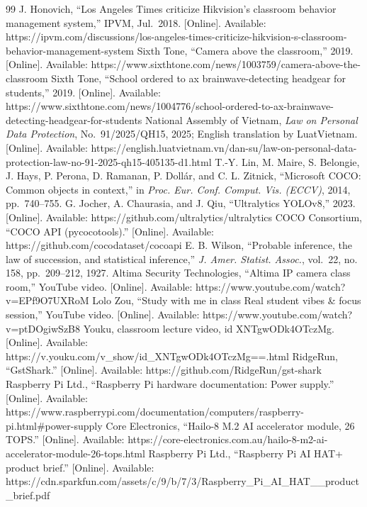 \begin{thebibliography}{99}
 J. Honovich, ``Los Angeles Times criticize Hikvision's classroom behavior management system,'' IPVM, Jul.~2018. {[}Online{]}. Available: https://ipvm.com/discussions/los-angeles-times-criticize-hikvision-s-classroom-behavior-management-system
 Sixth Tone, ``Camera above the classroom,'' 2019. {[}Online{]}. Available: https://www.sixthtone.com/news/1003759/camera-above-the-classroom
 Sixth Tone, ``School ordered to ax brainwave-detecting headgear for students,'' 2019. {[}Online{]}. Available: https://www.sixthtone.com/news/1004776/school-ordered-to-ax-brainwave-detecting-headgear-for-students
 National Assembly of Vietnam, \emph{Law on Personal Data Protection}, No.~91/2025/QH15, 2025; English translation by LuatVietnam. {[}Online{]}. Available: https://english.luatvietnam.vn/dan-su/law-on-personal-data-protection-law-no-91-2025-qh15-405135-d1.html
 T.-Y. Lin, M. Maire, S. Belongie, J. Hays, P. Perona, D. Ramanan, P. Dollár, and C. L. Zitnick, ``Microsoft COCO: Common objects in context,'' in \emph{Proc. Eur. Conf. Comput. Vis. (ECCV)}, 2014, pp.~740--755.
 G. Jocher, A. Chaurasia, and J. Qiu, ``Ultralytics YOLOv8,'' 2023. {[}Online{]}. Available: https://github.com/ultralytics/ultralytics
 COCO Consortium, ``COCO API (pycocotools).'' {[}Online{]}. Available: https://github.com/cocodataset/cocoapi
 E. B. Wilson, ``Probable inference, the law of succession, and statistical inference,'' \emph{J. Amer. Statist. Assoc.}, vol.~22, no. 158, pp.~209--212, 1927.
 Altima Security Technologies, ``Altima IP camera class room,'' YouTube video. {[}Online{]}. Available: https://www.youtube.com/watch?v=EPf9O7UXRoM
 Lolo Zou, ``Study with me in class \textbar{} Real student vibes \& focus session,'' YouTube video. {[}Online{]}. Available: https://www.youtube.com/watch?v=ptDOgiwSzB8
 Youku, classroom lecture video, id XNTgwODk4OTczMg. {[}Online{]}. Available: https://v.youku.com/v\_show/id\_XNTgwODk4OTczMg==.html
 RidgeRun, ``GstShark.'' {[}Online{]}. Available: https://github.com/RidgeRun/gst-shark
 Raspberry Pi Ltd., ``Raspberry Pi hardware documentation: Power supply.'' {[}Online{]}. Available: https://www.raspberrypi.com/documentation/computers/raspberry-pi.html\#power-supply
 Core Electronics, ``Hailo-8 M.2 AI accelerator module, 26 TOPS.'' {[}Online{]}. Available: https://core-electronics.com.au/hailo-8-m2-ai-accelerator-module-26-tops.html
 Raspberry Pi Ltd., ``Raspberry Pi AI HAT+ product brief.'' {[}Online{]}. Available: https://cdn.sparkfun.com/assets/c/9/b/7/3/Raspberry\_Pi\_AI\_HAT\_\_product\_brief.pdf

\end{thebibliography}
